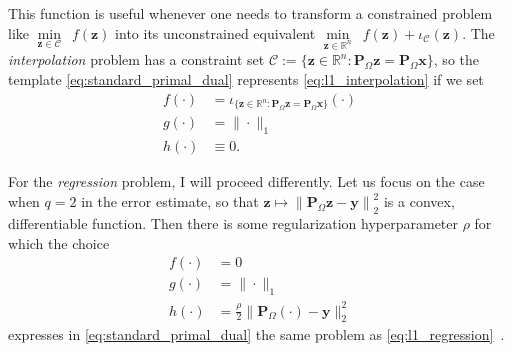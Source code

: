 This function is useful whenever one needs to transform a constrained problem like $\underset{\mathbf{z} \in \mathcal{C}}{\min} \enspace f(\mathbf{z})$ into its unconstrained equivalent $\underset{\mathbf{z} \in \mathbb{R}^{n}}{\min} \enspace f(\mathbf{z}) + \iota_{\mathcal{C}}(\mathbf{z})$. The \emph{interpolation} problem has a constraint set $\mathcal{C} := \{ \mathbf{z} \in \mathbb{R}^{n} : \mathbf{P}_{\Omega}\mathbf{z} = \mathbf{P}_{\Omega} \mathbf{x}\}$, so the template \eqref{eq:standard_primal_dual} represents \eqref{eq:l1_interpolation} if we set
\begin{align}
    f(\cdot) & = \iota_{\{ \mathbf{z} \in \mathbb{R}^{n} : \mathbf{P}_{\Omega}\mathbf{z} = \mathbf{P}_{\Omega} \mathbf{x}\}}(\cdot) \\
    g(\cdot) & = \| \cdot \|_1 \\
    h(\cdot) & \equiv 0.
\end{align}

For the \emph{regression} problem, I will proceed differently. Let us focus on the case when $q = 2$ in the error estimate, so that $\mathbf{z} \mapsto \left\|\mathbf{P}_{\Omega} \mathbf{z} - \mathbf{y}\right\|_2^2$ is a convex, differentiable function. Then there is some regularization hyperparameter $\rho$ for which the choice
\begin{align}
    f(\cdot) & = 0 \\
    g(\cdot) & = \| \cdot \|_1 \\
    h(\cdot) & = \frac{\rho}{2} \| \mathbf{P}_{\Omega} (\cdot) - \mathbf{y}\|_2^2
\end{align}
expresses in \eqref{eq:standard_primal_dual} the same problem as \eqref{eq:l1_regression}~\cite[Ch. 5]{boyd2009}.

